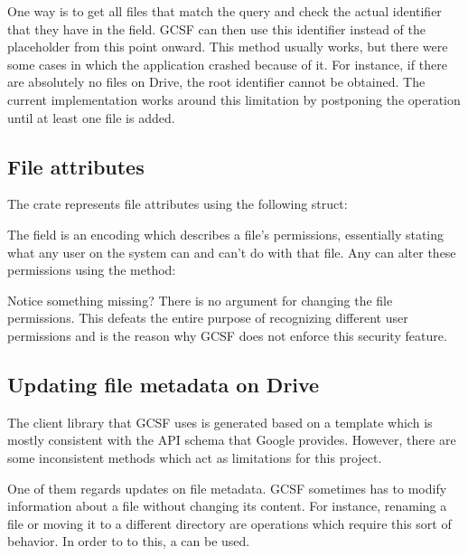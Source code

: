 One way is to get all files that match the  query and check the actual identifier that they have in the  field. GCSF can then use this identifier instead of the  placeholder from this point onward. This method usually works, but there were some cases in which the application crashed because of it. For instance, if there are absolutely no files on Drive, the root identifier cannot be obtained. The current implementation works around this limitation by postponing the operation until at least one file is added.

\subsection{File attributes}

The  crate represents file attributes using the following struct:



The  field is an encoding which describes a file's permissions, essentially stating what any user on the system can and can't do with that file. Any  can alter these permissions using the  method:




Notice something missing? There is no argument for changing the file permissions. This defeats the entire purpose of recognizing different user permissions and is the reason why GCSF does not enforce this security feature.

\subsection{Updating file metadata on Drive} \label{updating_metadata}

The client library that GCSF uses is generated based on a template which is mostly consistent with the API schema that Google provides. However, there are some inconsistent methods which act as limitations for this project.

One of them regards updates on file metadata. GCSF sometimes has to modify information about a file without changing its content. For instance, renaming a file or moving it to a different directory are operations which require this sort of behavior. In order to to this, a  can be used.

